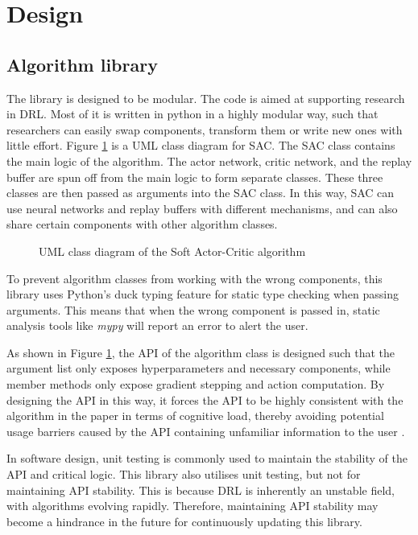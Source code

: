 \section{Design} \label{sec:design}

\subsection{Algorithm library}

The library is designed to be modular. The code is aimed at supporting research in DRL. Most of it is written in python in a highly modular way, such that researchers can easily swap components, transform them or write new ones with little effort. Figure \ref{fig:sac-uml} is a UML class diagram for SAC. The SAC class contains the main logic of the algorithm. The actor network, critic network, and the replay buffer are spun off from the main logic to form separate classes. These three classes are then passed as arguments into the SAC class. In this way, SAC can use neural networks and replay buffers with different mechanisms, and can also share certain components with other algorithm classes.
\begin{figure}[htbp]
   \centering
   
   \caption{UML class diagram of the Soft Actor-Critic algorithm}
   \label{fig:sac-uml}
\end{figure}

To prevent algorithm classes from working with the wrong components, this library uses Python's duck typing feature for static type checking when passing arguments. This means that when the wrong component is passed in, static analysis tools like \textit{mypy} will report an error to alert the user.

As shown in Figure \ref{fig:sac-uml}, the API of the algorithm class is designed such that the argument list only exposes hyperparameters and necessary components, while member methods only expose gradient stepping and action computation. By designing the API in this way, it forces the API to be highly consistent with the algorithm in the paper in terms of cognitive load, thereby avoiding potential usage barriers caused by the API containing unfamiliar information to the user \cite{ref:api}.

In software design, unit testing is commonly used to maintain the stability of the API and critical logic. This library also utilises unit testing, but not for maintaining API stability. This is because DRL is inherently an unstable field, with algorithms evolving rapidly. Therefore, maintaining API stability may become a hindrance in the future for continuously updating this library.

